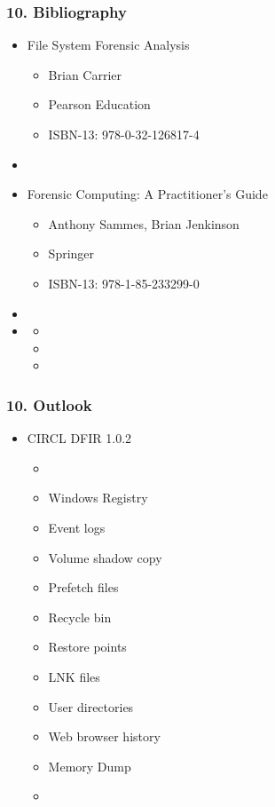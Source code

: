 \begin{frame}
  \frametitle{10. Bibliography}
  \begin{itemize}
      \item File System Forensic Analysis
        \begin{itemize}
            \item[] Brian Carrier
            \item[] Pearson Education
            \item[] ISBN-13: 978-0-32-126817-4
        \end{itemize}
      \item[]
      \item Forensic Computing: A Practitioner’s Guide
        \begin{itemize}
            \item[] Anthony Sammes, Brian Jenkinson
            \item[] Springer
            \item[] ISBN-13: 978-1-85-233299-0
        \end{itemize}
      \item[]
      \item[] 
        \begin{itemize}
            \item[]
            \item[]
            \item[] 
        \end{itemize}
  \end{itemize}
\end{frame}


\begin{frame}
  \frametitle{10. Outlook}
  \begin{itemize}
      \item[] CIRCL DFIR 1.0.2
      \begin{itemize}
          \item[]
          \item[] Windows Registry
          \item[] Event logs
          \item[] Volume shadow copy
          \item[] Prefetch files
          \item[] Recycle bin
          \item[] Restore points
          \item[] LNK files
          \item[] User directories
          \item[] Web browser history
          \item[] Memory Dump
          \item[]
      \end{itemize}
  \end{itemize}
\end{frame}

